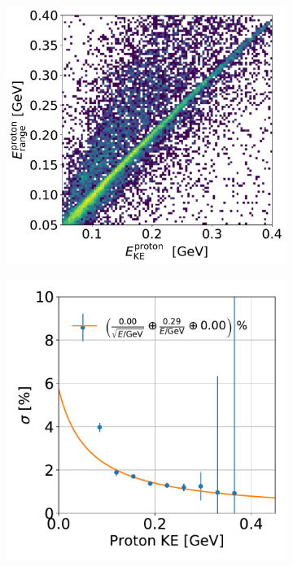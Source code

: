 \begin{figure}[H]
\begin{center}
\begin{subfigure}[b]{0.38\textwidth}
    \end{subfigure}
    \begin{subfigure}[b]{0.4\textwidth}
    \centering
    \includegraphics[width=1.00\textwidth]{ereco/proton_eres2D.pdf}
    \end{subfigure}
    \begin{subfigure}[b]{0.38\textwidth}
    \centering
    \includegraphics[width=1.00\textwidth]{ereco/proton_eres_vs_true.pdf}

\end{subfigure}
\end{center}
\end{figure}
